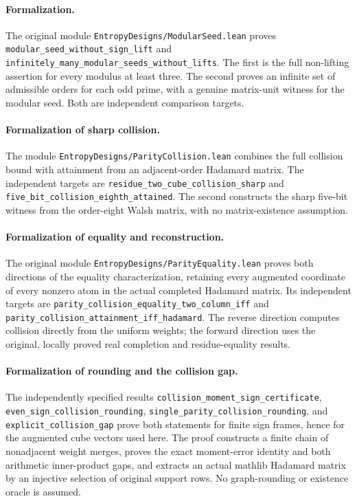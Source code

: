 \paragraph{Formalization.}
The original module \texttt{EntropyDesigns/\allowbreak ModularSeed.lean} proves
\texttt{modular\_\allowbreak seed\_\allowbreak without\_\allowbreak sign\_\allowbreak lift}
and \texttt{infinitely\_\allowbreak many\_\allowbreak modular\_\allowbreak seeds\_\allowbreak without\_\allowbreak lifts}.
The first is the full non-lifting assertion for every modulus at least
three. The second proves an infinite set of admissible orders for each
odd prime, with a genuine matrix-unit witness for the modular seed.
Both are independent comparison targets.

\paragraph{Formalization of sharp collision.}
The module \texttt{EntropyDesigns/\allowbreak ParityCollision.lean}
combines the full collision bound with attainment from an adjacent-order
Hadamard matrix. The independent targets are
\texttt{residue\_\allowbreak two\_\allowbreak cube\_\allowbreak collision\_\allowbreak sharp}
and \texttt{five\_\allowbreak bit\_\allowbreak collision\_\allowbreak eighth\_\allowbreak attained}.
The second constructs the sharp five-bit witness from the order-eight
Walsh matrix, with no matrix-existence assumption.

\paragraph{Formalization of equality and reconstruction.}
The original module \texttt{EntropyDesigns/\allowbreak ParityEquality.lean}
proves both directions of the equality characterization, retaining every
augmented coordinate of every nonzero atom in the actual completed
Hadamard matrix. Its independent targets are
\texttt{parity\_\allowbreak collision\_\allowbreak equality\_\allowbreak two\_\allowbreak column\_\allowbreak iff}
and \texttt{parity\_\allowbreak collision\_\allowbreak attainment\_\allowbreak iff\_\allowbreak hadamard}.
The reverse direction computes collision directly from the uniform weights;
the forward direction uses the original, locally proved real completion
and residue-equality results.

\paragraph{Formalization of rounding and the collision gap.} The independently specified results \texttt{collision\_\allowbreak moment\_\allowbreak sign\_\allowbreak certificate}, \texttt{even\_\allowbreak sign\_\allowbreak collision\_\allowbreak rounding}, \texttt{single\_\allowbreak parity\_\allowbreak collision\_\allowbreak rounding}, and \texttt{explicit\_\allowbreak collision\_\allowbreak gap} prove both statements for finite sign frames, hence for the augmented cube vectors used here. The proof constructs a finite chain of nonadjacent weight merges, proves the exact moment-error identity and both arithmetic inner-product gaps, and extracts an actual mathlib Hadamard matrix by an injective selection of original support rows. No graph-rounding or existence oracle is assumed.
